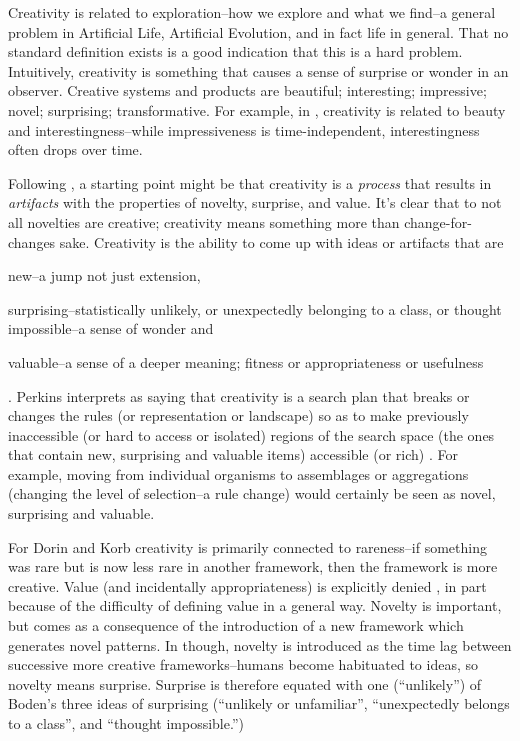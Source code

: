 \begin{mdframed}[style=box, frametitle={Creativity, and its relationship to Novelty, Surprise, and Value}]
Creativity is related to exploration--how we explore and what we find--a general problem in Artificial Life, Artificial Evolution, and in fact life in general. That no standard definition exists is a good indication that this is a hard problem. Intuitively, creativity is something that causes a sense of surprise or wonder in an observer. Creative systems and products are beautiful; interesting; impressive; novel; surprising; transformative.  For example, in \parencite{Lehman2012}, creativity is related to beauty and interestingness--while impressiveness is time-independent, interestingness often drops over time.

Following \textcite{Boden2004}, a starting point might be that creativity is a \emph{process} that results in \emph{artifacts} with the properties of novelty, surprise, and value. It's clear that to \cite{Boden2004} not all novelties are creative; creativity means something more than change-for-changes sake. Creativity is the ability to come up with ideas or artifacts that are \begin{inparaenum}[1)]\item new--a jump not just extension,\item surprising--statistically unlikely, or unexpectedly belonging to a class, or thought impossible--a sense of wonder and \item valuable--a sense of a deeper meaning; fitness or appropriateness or usefulness \end{inparaenum}\parencite{Boden2004}. Perkins interprets \cite{Boden2004} as saying that creativity is a search plan that breaks or changes the rules (or representation or landscape) so as to make previously inaccessible (or hard to access or isolated) regions of the search space (the ones that contain new, surprising and valuable items) accessible (or rich) \parencite{Perkins1995}. For example, moving from individual organisms to assemblages or aggregations (changing the level of selection--a rule change) would certainly be seen as novel, surprising and valuable.

For Dorin and Korb \cite{Dorin2009} creativity is primarily connected to rareness--if something was rare but is now less rare in another framework, then the framework is more creative. Value (and incidentally appropriateness) is explicitly denied \cite[p.18]{Dorin2009}, in part because of the difficulty of defining value in a general way. Novelty is important, but comes as a consequence of the introduction of a new framework which generates novel patterns. In \cite[p.16]{Dorin2009} though, novelty is introduced as the time lag between successive more creative frameworks--humans become habituated to ideas, so novelty means surprise. Surprise is therefore equated with one (``unlikely'') of Boden's three ideas of surprising (``unlikely or unfamiliar'', ``unexpectedly belongs to a class'', and ``thought impossible.'')


\end{mdframed}
